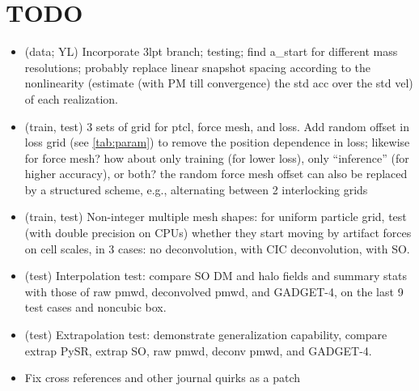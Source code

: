 \documentclass[modern, trackchanges, dvipsnames]{aastex631}
\newcommand{\GADGET}{{{\fontsize{10pt}{12pt}\selectfont GADGET}-4}}
\begin{document}
\section*{TODO}
\begin{itemize}
\item (data; YL) Incorporate 3lpt branch; testing; find a\_start for
  different mass resolutions; probably replace linear snapshot spacing
  according to the nonlinearity (estimate (with PM till convergence) the
  std acc over the std vel) of each realization.
\item (train, test) 3 sets of grid for ptcl, force mesh, and loss. Add
  random offset in loss grid (see \autoref{tab:param}) to remove the
  position dependence in loss; likewise for force mesh? how about only
  training (for lower loss), only ``inference'' (for higher accuracy),
  or both? the random force mesh offset can also be replaced by a
  structured scheme, e.g., alternating between 2 interlocking grids
\item (train, test) Non-integer multiple mesh shapes: for uniform
  particle grid, test (with double precision on CPUs) whether they start
  moving by artifact forces on cell scales, in 3 cases: no
  deconvolution, with CIC deconvolution, with SO.
\item (test) Interpolation test: compare SO DM and halo fields and
  summary stats with those of raw pmwd, deconvolved pmwd, and \GADGET,
  on the last 9 test cases and noncubic box.
\item (test) Extrapolation test: demonstrate generalization capability,
  compare extrap PySR, extrap SO, raw pmwd, deconv pmwd, and \GADGET.
\item Fix cross references and other journal quirks as a patch
\end{itemize}
\end{document}
